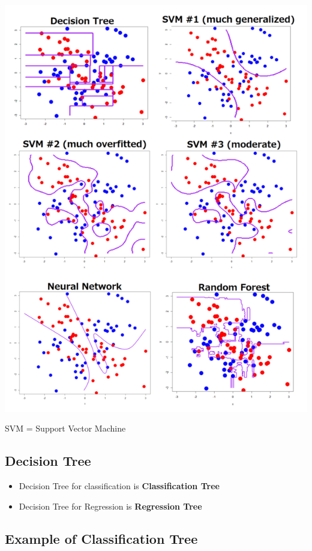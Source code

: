 \documentclass[
]{article}
\providecommand{\tightlist}{%
  \setlength{\itemsep}{0pt}\setlength{\parskip}{0pt}}
\begin{document}
\includegraphics{images/db1.png}

SVM = Support Vector Machine

\hypertarget{decision-tree}{%
\subsection{Decision Tree}\label{decision-tree}}

\begin{itemize}
\tightlist
\item
  Decision Tree for classification is \textbf{Classification Tree}
\item
  Decision Tree for Regression is \textbf{Regression Tree}
\end{itemize}

\hypertarget{example-of-classification-tree}{%
\subsection{Example of Classification
Tree}\label{example-of-classification-tree}}
\end{document}
